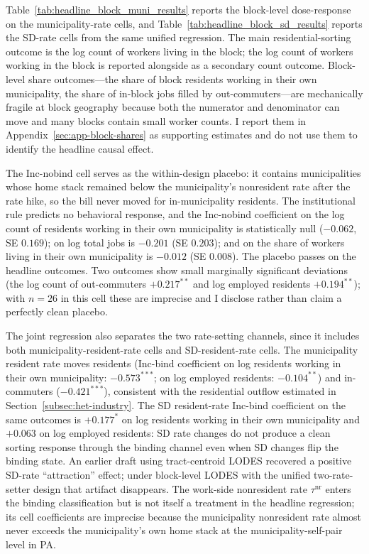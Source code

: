 \documentclass[12pt]{article}
\begin{document}
Table~\ref{tab:headline_block_muni_results} reports the block-level
dose-response on the municipality-rate cells, and
Table~\ref{tab:headline_block_sd_results} reports the SD-rate cells
from the same unified regression. The main residential-sorting
outcome is the log count of workers living in the block; the log
count of workers working in the block is reported alongside as a
secondary count outcome. Block-level share outcomes---the share of
block residents working in their own municipality, the share of
in-block jobs filled by out-commuters---are mechanically fragile at
block geography because both the numerator and denominator can move
and many blocks contain small worker counts. I report them in
Appendix~\ref{sec:app-block-shares} as supporting estimates and do
not use them to identify the headline causal effect.





The Inc-nobind cell serves as the within-design placebo: it contains municipalities whose home
stack remained below the municipality's nonresident rate after the rate hike,
so the bill never moved for in-municipality residents. The institutional rule
predicts no behavioral response, and the Inc-nobind coefficient on
the log count of residents working in their own municipality is statistically null ($-0.062$, SE
$0.169$); on log total jobs is $-0.201$ (SE $0.203$); and
on the share of workers living in their own municipality is $-0.012$ (SE $0.008$). The placebo
passes on the headline outcomes. Two outcomes show small marginally
significant deviations (the log count of out-commuters $+0.217^{**}$
and log employed residents $+0.194^{**}$); with $n=26$ in this
cell these are imprecise and I disclose rather than claim a perfectly
clean placebo.

The joint regression also separates the two rate-setting channels, since it includes both municipality-resident-rate cells and
SD-resident-rate cells. The municipality resident rate moves residents
(Inc-bind coefficient on log residents working in their own
municipality: $-0.573^{***}$; on log employed residents:
$-0.104^{**}$) and in-commuters ($-0.421^{***}$), consistent with the
residential outflow estimated in
Section~\ref{subsec:het-industry}. The SD resident-rate Inc-bind
coefficient on the same outcomes is $+0.177^{*}$ on log residents
working in their own municipality and $+0.063$ on log employed
residents: SD rate changes do not produce a clean sorting response
through the binding channel even when SD changes flip the binding
state. An earlier draft using tract-centroid LODES recovered a
positive SD-rate ``attraction'' effect; under block-level LODES with
the unified two-rate-setter design that artifact disappears. The
work-side nonresident rate $\tau^{\text{nr}}$ enters the
binding classification but is not itself a treatment in the
headline regression; its cell coefficients are imprecise because the
municipality nonresident rate almost never exceeds the municipality's own home stack
at the municipality-self-pair level in PA.
\end{document}
